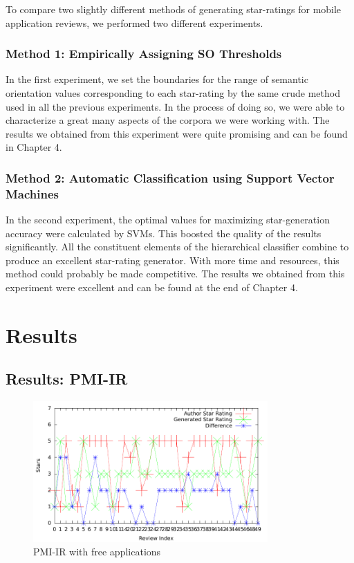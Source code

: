 \documentclass[11pt]{report} %
\begin{document}
To compare two slightly different methods of generating star-ratings for mobile application reviews, we performed two different experiments.

	\subsection{Method 1: Empirically Assigning SO Thresholds}

In the first experiment, we set the boundaries for the range of semantic orientation values corresponding to each star-rating by the same crude method used in all the previous experiments. In the process of doing so, we were able to characterize a great many aspects of the corpora we were working with. The results we obtained from this experiment were quite promising and can be found in Chapter 4.

	\subsection{Method 2: Automatic Classification using Support Vector Machines}

In the second experiment, the optimal values for maximizing star-generation accuracy were calculated by SVMs. This boosted the quality of the results significantly. All the constituent elements of the hierarchical classifier combine to produce an excellent star-rating generator. With more time and resources, this method could probably be made competitive. The results we obtained from this experiment were excellent and can be found at the end of Chapter 4.



\chapter{Results}
\label{chapter:results}
	\section{Results: PMI-IR}

	\begin{figure}[H]
	\centering
	\includegraphics[width=0.8\textwidth]{data/pmi-free.pdf}
	\caption{PMI-IR with free applications}
	\label{fig:pmi-free}
	\end{figure}
\end{document}
